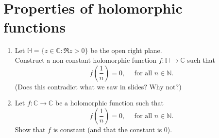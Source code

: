 \documentclass[12pt]{article}
\theoremstyle{definition}
\numberwithin{thm}{section}
\begin{document}
\newpage\section{Properties of holomorphic functions}
\begin{enumerate}
	\item Let $\mathbb{H} = \{z \in \mathbb{C} : \Re z > 0\}$ be the open right plane.\\
	Construct a non-constant holomorphic function $f:\mathbb{H} \to \mathbb{C}$ such that
	\begin{equation*} 
		f\left(\dfrac{1}{n}\right) = 0, \quad \text{ for all } n \in \mathbb{N}.
	\end{equation*}
	(Does this contradict what we saw in slides? Why not?)
	\item Let $f:\mathbb{C} \to \mathbb{C}$ be a holomorphic function such that
	\begin{equation*} 
		f\left(\dfrac{1}{n}\right) = 0, \quad \text{ for all } n \in \mathbb{N}.
	\end{equation*}
	Show that $f$ is constant (and that the constant is $0$).
\end{enumerate}
\end{document}
